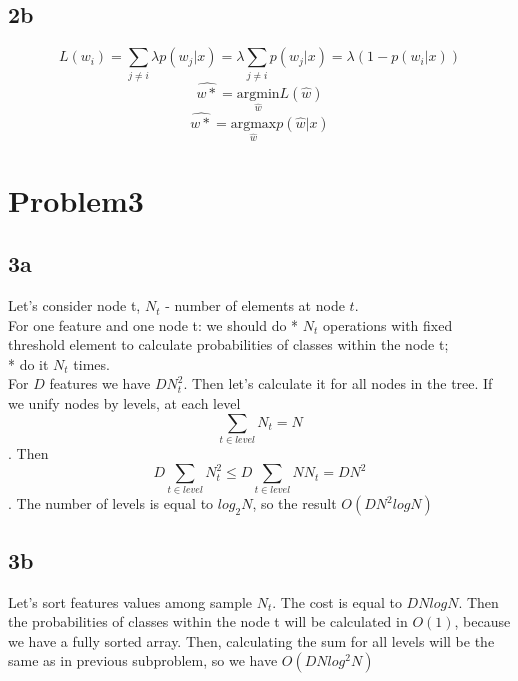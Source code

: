 \documentclass[12pt]{article}
\renewcommand{\omega}{w}
\begin{document}
\subsection{2b}

$$L(\omega_i) = \sum_{j \ne i} \lambda p(\omega_j|x) = \lambda  \sum_{j \ne i} p(\omega_j|x) = \lambda ( 1 - p(\omega_i|x))$$
$$\hat{\omega*} = \underset{\hat{\omega}}{\text{argmin}} L(\hat{\omega})$$
 $$\hat{\omega*} = \underset{\hat{\omega}}{\text{argmax}} p(\hat{\omega}|x)$$
 
\section{Problem3}

\subsection{3a}
Let's consider node t, $N_t$ - number of elements at node $t$.\\
For one feature and one node t: we should do 
* $N_t$ operations with fixed threshold element to calculate probabilities of classes within the node t;\\
* do it $N_t$ times.\\
For $D$ features we have $DN_t^2$. Then let's calculate it for all nodes in the tree. If we unify nodes by levels, at each level
$$\sum_{t\in level} N_t = N$$. Then $$D\sum_{t \in level} N_t^2 \leq D\sum_{t\in level} NN_t = DN^2$$. The number of levels is equal to $log_2N$, so the result $O(DN^2logN)$  

\subsection{3b}
Let's sort features values among sample $N_t$. The cost is equal to $DNlogN$. Then the probabilities of classes within the node t will be calculated in $O(1)$, because we have a fully sorted array. Then, calculating the sum for all levels will be the same as in previous subproblem, so we have $O(DNlog^2N)$
\end{document}

